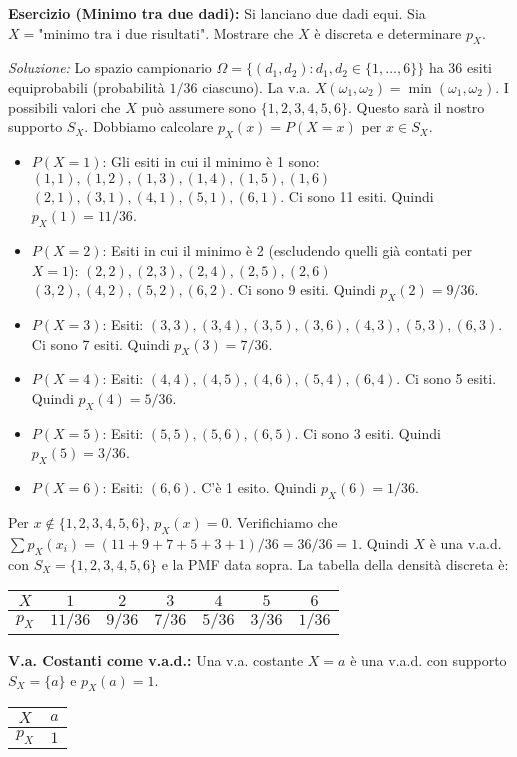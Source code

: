 \begin{example}
\textbf{Esercizio (Minimo tra due dadi):}
Si lanciano due dadi equi. Sia $X = \text{"minimo tra i due risultati"}$. Mostrare che $X$ è discreta e determinare $p_X$.

\textit{Soluzione:}
Lo spazio campionario $\Omega = \{(d_1,d_2) : d_1,d_2 \in \{1,\dots,6\}\}$ ha 36 esiti equiprobabili (probabilità $1/36$ ciascuno).
La v.a. $X(\omega_1, \omega_2) = \min(\omega_1, \omega_2)$.
I possibili valori che $X$ può assumere sono $\{1, 2, 3, 4, 5, 6\}$. Questo sarà il nostro supporto $S_X$.
Dobbiamo calcolare $p_X(x) = P(X=x)$ per $x \in S_X$.
\begin{itemize}
    \item $P(X=1)$: Gli esiti in cui il minimo è 1 sono:
    $(1,1), (1,2), (1,3), (1,4), (1,5), (1,6)$
    $(2,1), (3,1), (4,1), (5,1), (6,1)$.
    Ci sono 11 esiti. Quindi $p_X(1) = 11/36$.
    \item $P(X=2)$: Esiti in cui il minimo è 2 (escludendo quelli già contati per $X=1$):
    $(2,2), (2,3), (2,4), (2,5), (2,6)$
    $(3,2), (4,2), (5,2), (6,2)$.
    Ci sono 9 esiti. Quindi $p_X(2) = 9/36$.
    \item $P(X=3)$: Esiti: $(3,3), (3,4), (3,5), (3,6), (4,3), (5,3), (6,3)$.
    Ci sono 7 esiti. Quindi $p_X(3) = 7/36$.
    \item $P(X=4)$: Esiti: $(4,4), (4,5), (4,6), (5,4), (6,4)$.
    Ci sono 5 esiti. Quindi $p_X(4) = 5/36$.
    \item $P(X=5)$: Esiti: $(5,5), (5,6), (6,5)$.
    Ci sono 3 esiti. Quindi $p_X(5) = 3/36$.
    \item $P(X=6)$: Esiti: $(6,6)$.
    C'è 1 esito. Quindi $p_X(6) = 1/36$.
\end{itemize}
Per $x \notin \{1,2,3,4,5,6\}$, $p_X(x)=0$.
Verifichiamo che $\sum p_X(x_i) = (11+9+7+5+3+1)/36 = 36/36 = 1$.
Quindi $X$ è una v.a.d. con $S_X = \{1,2,3,4,5,6\}$ e la PMF data sopra.
La tabella della densità discreta è:
\begin{center}
\begin{tabular}{c|cccccc}
$X$ & $1$ & $2$ & $3$ & $4$ & $5$ & $6$ \\
\hline
$p_X$ & $11/36$ & $9/36$ & $7/36$ & $5/36$ & $3/36$ & $1/36$ \\
\end{tabular}
\end{center}
\end{example}

\textbf{V.a. Costanti come v.a.d.:}
Una v.a. costante $X=a$ è una v.a.d. con supporto $S_X=\{a\}$ e $p_X(a)=1$.
\begin{center}
\begin{tabular}{c|c}
$X$ & $a$ \\
\hline
$p_X$ & $1$ \\
\end{tabular}
\end{center}

